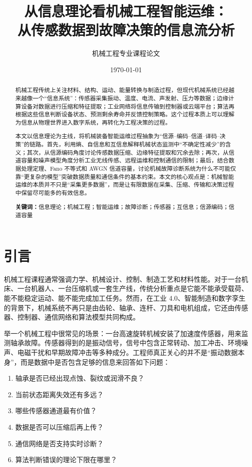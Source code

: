 \documentclass[UTF8,a4paper,12pt]{ctexart}
\title{\vspace{-1.2cm}\sffamily\bfseries 从信息理论看机械工程智能运维：\\从传感数据到故障决策的信息流分析}
\author{机械工程专业课程论文}
\date{\today}
\begin{document}
\maketitle
\thispagestyle{empty}
\vspace{-1.0em}

\begin{abstract}
机械工程传统上关注材料、结构、运动、能量转换与制造过程，但现代机械系统已经越来越像一个“信息系统”：传感器采集振动、温度、电流、声发射、压力等数据；边缘计算设备对数据进行压缩和特征提取；工业网络将信息传输到控制器或云端平台；算法再根据这些信息判断设备状态、预测剩余寿命并反馈控制策略。这个过程本质上可以理解为信息从物理世界进入数字系统，再转化为工程决策的过程。

本文以信息理论为主线，将机械装备智能运维过程抽象为“信源--编码--信道--译码--决策”的链路。首先，利用熵、自信息和互信息解释机械状态监测中“不确定性减少”的含义；其次，从信源编码角度讨论传感数据压缩、边缘特征提取和冗余去除；再次，从信道容量和噪声模型角度分析工业无线传感、远程运维和控制通信的限制；最后，结合数据处理定理、Fano 不等式和 AWGN 信道容量，讨论机械故障诊断系统为什么不可能仅靠“更复杂的模型”突破数据质量和通信条件的基本约束。本文的核心观点是：机械智能运维的本质并不只是“采集更多数据”，而是让有限数据在采集、压缩、传输和决策过程中保留尽可能多的有效信息。

\noindent\textbf{关键词：}信息理论；机械工程；智能运维；故障诊断；传感器；互信息；信源编码；信道容量
\end{abstract}

\clearpage
\tableofcontents
\clearpage
{}

\section{引言}

机械工程课程通常强调力学、机械设计、控制、制造工艺和材料性能。对于一台机床、一台机器人、一台压缩机或一套生产线，传统分析重点是它能不能承受载荷、能不能稳定运动、能不能完成加工任务。然而，在工业 4.0、智能制造和数字孪生的背景下，机械系统不再只是由齿轮、轴承、连杆、刀具和电机组成，它还由传感器、控制器、通信网络和算法模型共同构成。

举一个机械工程中很常见的场景：一台高速旋转机械安装了加速度传感器，用来监测轴承故障。传感器得到的是振动信号，信号中包含正常转动、加工冲击、环境噪声、电磁干扰和早期故障冲击等多种成分。工程师真正关心的并不是“振动数据本身”，而是数据中是否包含足够的信息来回答如下问题：

\begin{enumerate}
  \item 轴承是否已经出现点蚀、裂纹或润滑不良？
  \item 当前状态距离失效还有多远？
  \item 哪些传感器通道最有价值？
  \item 数据是否可以压缩后再上传？
  \item 通信网络是否支持实时诊断？
  \item 算法判断错误的理论下限在哪里？
\end{enumerate}
\end{document}
